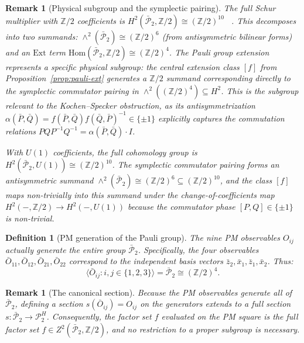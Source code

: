 \documentclass[11pt]{article}
\newtheorem{definition}[theorem]{Definition}
\newtheorem{remark}[theorem]{Remark}
\begin{document}
\begin{remark}[Physical subgroup and the symplectic pairing]
The full Schur multiplier with $\mathbb{Z}/2$ coefficients is
$H^2(\bar{\mathcal{P}}_2, \mathbb{Z}/2) \cong (\mathbb{Z}/2)^{10}$~
\cite{Kar87}.
This decomposes into two summands:
$\wedge^2(\bar{\mathcal{P}}_2) \cong (\mathbb{Z}/2)^6$ (from antisymmetric bilinear forms)
and an $\text{Ext}$ term $\mathrm{Hom}(\bar{\mathcal{P}}_2, \mathbb{Z}/2) \cong (\mathbb{Z}/2)^4$.
The Pauli group extension represents a specific physical subgroup:
the central extension class $[f]$ from Proposition~\ref{prop:pauli-ext}
generates a $\mathbb{Z}/2$ summand corresponding directly to the
\emph{symplectic commutator pairing} in
$\wedge^2((\mathbb{Z}/2)^4) \subseteq H^2$.
This is the subgroup relevant to the Kochen--Specker obstruction,
as its antisymmetrization
$\alpha(\bar{P}, \bar{Q}) = f(\bar{P}, \bar{Q})f(\bar{Q}, \bar{P})^{-1} \in \{\pm 1\}$
explicitly captures the commutation relations $P Q P^{-1} Q^{-1} = \alpha(\bar{P}, \bar{Q}) \cdot I$.

With $U(1)$ coefficients, the full cohomology group is $H^2(\bar{\mathcal{P}}_2, U(1)) \cong (\mathbb{Z}/2)^{10}$. The symplectic commutator pairing forms an antisymmetric summand $\wedge^2(\bar{\mathcal{P}}_2) \cong (\mathbb{Z}/2)^6 \subseteq (\mathbb{Z}/2)^{10}$, and the class $[f]$ maps non-trivially into this summand under the change-of-coefficients map $H^2(-, \mathbb{Z}/2) \to H^2(-, U(1))$ because the commutator phase $[P,Q] \in \{\pm 1\}$ is non-trivial.
\end{remark}

\begin{definition}[PM generation of the Pauli group]
\label{def:pm-subgroup}
The nine PM observables $O_{ij}$ actually generate the entire group $\bar{\mathcal{P}}_2$.
Specifically, the four observables $\bar{O}_{11}, \bar{O}_{12}, \bar{O}_{21}, \bar{O}_{22}$
correspond to the independent basis vectors $\bar{z}_2, \bar{x}_1, \bar{z}_1, \bar{x}_2$. Thus:
\[
  \langle \bar{O}_{ij} : i,j \in \{1,2,3\} \rangle = \bar{\mathcal{P}}_2 \cong (\mathbb{Z}/2)^4.
\]
\end{definition}

\begin{remark}[The canonical section]
\label{rem:restriction}
Because the PM observables generate all of $\bar{\mathcal{P}}_2$, defining a
section $s(\bar{O}_{ij}) = O_{ij}$ on the generators extends to a full section
$s: \bar{\mathcal{P}}_2 \to \mathcal{P}_2^H$. Consequently, the factor set $f$
evaluated on the PM square is the full factor set $f \in Z^2(\bar{\mathcal{P}}_2, \mathbb{Z}/2)$,
and no restriction to a proper subgroup is necessary.
\end{remark}
\end{document}
